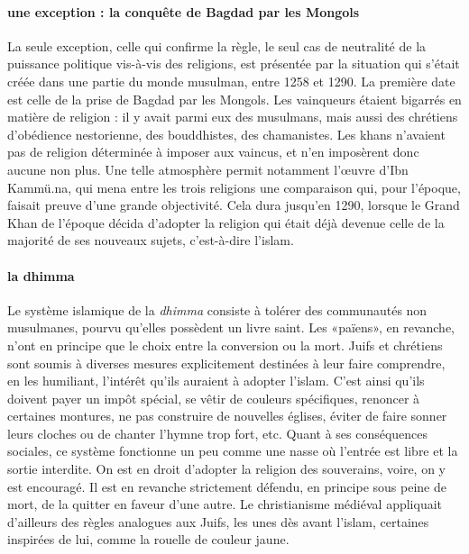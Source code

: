 \paragraph{une exception : la conquête de Bagdad par les Mongols}
La seule exception, celle qui confirme la règle, le seul cas de neutralité de la puissance politique vis-à-vis des religions, est présentée par la situation qui s'était créée dans une partie du monde musulman, entre 1258 et 1290. La première date est celle de la prise de Bagdad par les Mongols. Les vainqueurs étaient bigarrés en matière de religion : il y avait parmi eux des musulmans, mais aussi des chrétiens d'obédience nestorienne, des bouddhistes, des chamanistes. Les khans n'avaient pas de religion déterminée à imposer aux vaincus, et n'en imposèrent donc aucune non plus. Une telle atmosphère permit notamment l'œuvre d'Ibn Kammü.na, qui mena entre les trois religions une comparaison qui, pour l'époque, faisait preuve d'une grande objectivité. Cela dura jusqu'en 1290, lorsque le Grand Khan de l'époque décida d'adopter la religion qui était déjà devenue celle de la majorité de ses nouveaux sujets, c'est-à-dire l'islam.
\paragraph{la dhimma}
Le système islamique de la \textit{dhimma}  consiste à tolérer des communautés non musulmanes, pourvu qu'elles possèdent un livre saint. Les «païens», en revanche, n'ont en principe que le choix entre la conversion ou la mort. Juifs et chrétiens sont soumis à diverses mesures explicitement destinées à leur faire comprendre, en les humiliant, l'intérêt qu'ils auraient à adopter l'islam. C'est ainsi qu'ils doivent payer un impôt spécial, se vêtir de couleurs spécifiques, renoncer à certaines montures, ne pas construire de nouvelles églises, éviter de faire sonner leurs cloches ou de chanter l'hymne trop fort, etc. Quant à ses conséquences sociales, ce système fonctionne un peu comme une nasse où l'entrée est libre et la sortie interdite. On est en droit d'adopter la religion des souverains, voire, on y est encouragé. Il est en revanche strictement défendu, en principe sous peine de mort, de la quitter en faveur d'une autre. Le christianisme médiéval appliquait d'ailleurs des règles analogues
aux Juifs, les unes dès avant l'islam, certaines inspirées de lui, comme la rouelle de couleur jaune.

